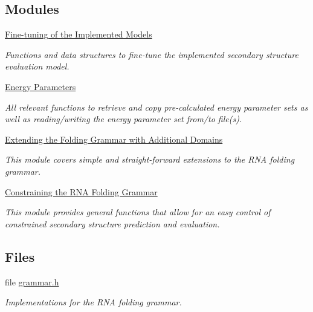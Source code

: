\subsection*{Modules}
\begin{DoxyCompactItemize}
\item 
\hyperlink{group__model__details}{Fine-\/tuning of the Implemented Models}
\begin{DoxyCompactList}\small\item\em Functions and data structures to fine-\/tune the implemented secondary structure evaluation model. \end{DoxyCompactList}\item 
\hyperlink{group__energy__parameters}{Energy Parameters}
\begin{DoxyCompactList}\small\item\em All relevant functions to retrieve and copy pre-\/calculated energy parameter sets as well as reading/writing the energy parameter set from/to file(s). \end{DoxyCompactList}\item 
\hyperlink{group__domains}{Extending the Folding Grammar with Additional Domains}
\begin{DoxyCompactList}\small\item\em This module covers simple and straight-\/forward extensions to the R\+NA folding grammar. \end{DoxyCompactList}\item 
\hyperlink{group__constraints}{Constraining the R\+N\+A Folding Grammar}
\begin{DoxyCompactList}\small\item\em This module provides general functions that allow for an easy control of constrained secondary structure prediction and evaluation. \end{DoxyCompactList}\end{DoxyCompactItemize}
\subsection*{Files}
\begin{DoxyCompactItemize}
\item 
file \hyperlink{grammar_8h}{grammar.\+h}
\begin{DoxyCompactList}\small\item\em Implementations for the R\+NA folding grammar. \end{DoxyCompactList}\end{DoxyCompactItemize}
